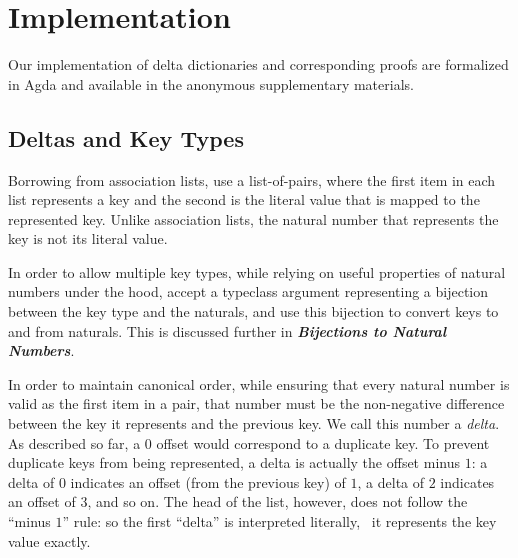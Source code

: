 \section{Implementation}
\label{sec:DD}



Our implementation of delta dictionaries and corresponding proofs are formalized in Agda and available in the anonymous supplementary materials.

\subsection{Deltas and Key Types}

Borrowing from association lists, \dds{} use a list-of-pairs, where the first item in each list represents a key and the second is the literal value that is mapped to the represented key.
%
Unlike association lists, the natural number that represents the key is not its literal value.

In order to allow multiple key types, while relying on useful properties of natural numbers under the hood, \dds{} accept a typeclass argument representing a bijection
%
between the key type and the naturals, and use this bijection to convert keys to and from naturals. This is discussed further in \emph{\textbf{Bijections to Natural Numbers}}.

In order to maintain canonical order, while ensuring that every natural number is valid as the first item in a pair, that number must be the non-negative difference between the key it represents and the previous key.
%
We call this number a \emph{delta}. %
%
As described so far, a $0$ offset would correspond to a duplicate key.
%
To prevent duplicate keys from being represented, a delta is actually the offset minus $1$: a delta of $0$ indicates an offset (from the previous key) of $1$, a delta of $2$ indicates an offset of $3$, and so on.
%
The head of the list, however, does not follow the ``minus $1$'' rule: so the first ``delta'' is interpreted literally, \ie{}~it represents the key value exactly.

